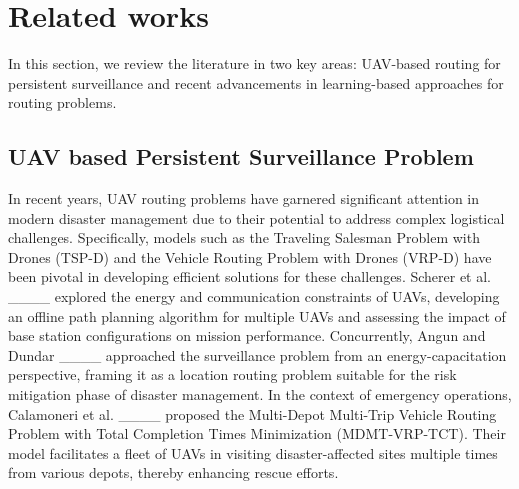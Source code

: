 \section{Related works}
\label{sec2}
In this section, we review the literature in two key areas: UAV-based routing for persistent surveillance and recent advancements in learning-based approaches for routing problems.

\subsection{UAV based Persistent Surveillance Problem}
In recent years, UAV routing problems have garnered significant attention in modern disaster management due to their potential to address complex logistical challenges. Specifically, models such as the Traveling Salesman Problem with Drones (TSP-D) and the Vehicle Routing Problem with Drones (VRP-D) have been pivotal in developing efficient solutions for these challenges. Scherer et al. ____ explored the energy and communication constraints of UAVs, developing an offline path planning algorithm for multiple UAVs and assessing the impact of base station configurations on mission performance. Concurrently, Angun and Dundar ____ approached the surveillance problem from an energy-capacitation perspective, framing it as a location routing problem suitable for the risk mitigation phase of disaster management. In the context of emergency operations, Calamoneri et al. ____ proposed the Multi-Depot Multi-Trip Vehicle Routing Problem with Total Completion Times Minimization (MDMT-VRP-TCT). Their model facilitates a fleet of UAVs in visiting disaster-affected sites multiple times from various depots, thereby enhancing rescue efforts.
